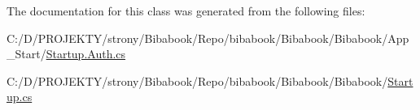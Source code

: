The documentation for this class was generated from the following files\+:\begin{DoxyCompactItemize}
\item 
C\+:/\+D/\+P\+R\+O\+J\+E\+K\+T\+Y/strony/\+Bibabook/\+Repo/bibabook/\+Bibabook/\+Bibabook/\+App\+\_\+\+Start/\hyperlink{_startup_8_auth_8cs}{Startup.\+Auth.\+cs}\item 
C\+:/\+D/\+P\+R\+O\+J\+E\+K\+T\+Y/strony/\+Bibabook/\+Repo/bibabook/\+Bibabook/\+Bibabook/\hyperlink{_startup_8cs}{Startup.\+cs}\end{DoxyCompactItemize}
